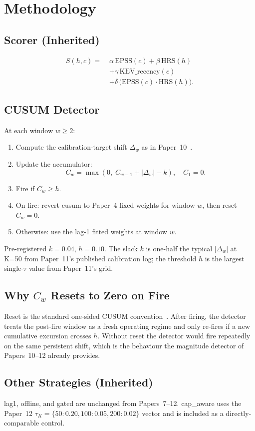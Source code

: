 \section{Methodology}

\subsection{Scorer (Inherited)}

\begin{equation}
\begin{aligned}
S(h,c) =\;& \alpha\,\mathrm{EPSS}(c) + \beta\,\mathrm{HRS}(h) \\
          & + \gamma\,\mathrm{KEV\_recency}(c) \\
          & + \delta\,\bigl(\mathrm{EPSS}(c) \cdot \mathrm{HRS}(h)\bigr).
\end{aligned}
\label{eq:hp}
\end{equation}

\subsection{CUSUM Detector}

At each window $w \geq 2$:
\begin{enumerate}
\item Compute the calibration-target shift $\Delta_w$ as in
Paper~10~\cite{paper10adaptive}.
\item Update the accumulator:
\begin{equation}
C_w = \max(0,\; C_{w-1} + |\Delta_w| - k), \quad C_1 = 0.
\end{equation}
\item Fire if $C_w \geq h$.
\item On fire: revert \textsf{cusum} to Paper~4 fixed weights for
window $w$, then reset $C_w = 0$.
\item Otherwise: use the lag-1 fitted weights at window $w$.
\end{enumerate}

Pre-registered $k = 0.04$, $h = 0.10$. The slack $k$ is one-half the
typical $|\Delta_w|$ at K=50 from Paper~11's published calibration
log; the threshold $h$ is the largest single-$\tau$ value from
Paper~11's grid.

\subsection{Why $C_w$ Resets to Zero on Fire}

Reset is the standard one-sided CUSUM convention~\cite{page1954cusum}.
After firing, the detector treats the post-fire window as a fresh
operating regime and only re-fires if a new cumulative excursion
crosses $h$. Without reset the detector would fire repeatedly on the
same persistent shift, which is the behaviour the magnitude detector
of Papers~10--12 already provides.

\subsection{Other Strategies (Inherited)}

\textsf{lag1}, \textsf{offline}, and \textsf{gated} are unchanged
from Papers~7--12. \textsf{cap\_aware} uses the Paper~12
$\tau_K = \{50: 0.20, 100: 0.05, 200: 0.02\}$ vector and is
included as a directly-comparable control.
